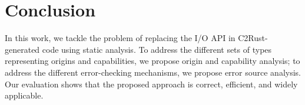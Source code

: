 \section{Conclusion}
\label{sec:conclusion}

In this work, we tackle the problem of replacing the I/O API in C2Rust-generated
code using static analysis.
%
To address the different sets of types representing origins and capabilities, we
propose origin and capability analysis;
%
to address the different error-checking mechanisms, we propose error source
analysis.
%
Our evaluation shows that the proposed approach is correct, efficient, and
widely applicable.
